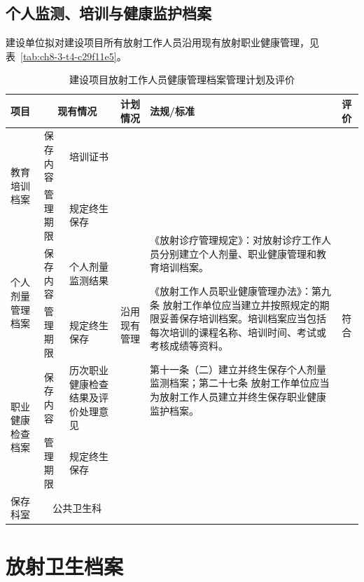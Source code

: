 \subsection{个人监测、培训与健康监护档案}

建设单位拟对建设项目所有放射工作人员沿用现有放射职业健康管理，见表~\ref{tab:ch8-3-t4-c29f11e5}。


\begin{table}[H]
\centering
\caption{建设项目放射工作人员健康管理档案管理计划及评价}
\label{tab:ch8-3-t5-9edc314a}
\renewcommand{\arraystretch}{1.5}
\begin{tabular}{|m{1.8cm}|m{1.8cm}|m{2.4cm}|m{1.8cm}|m{5cm}|m{1cm}|}
\hline
项目
& \multicolumn{2}{c|}{现有情况}
& 计划情况
& 法规/标准
& 评价 \\
\hline
\multirow{2}{=}{教育培训档案}
& 保存内容 & 培训证书
& \multirow{7}{=}{沿用现有管理}
& \multirow{7}{=}{《放射诊疗管理规定》：对放射诊疗工作人员分别建立个人剂量、职业健康管理和教育培训档案。

《放射工作人员职业健康管理办法》：第九条 放射工作单位应当建立并按照规定的期限妥善保存培训档案。培训档案应当包括每次培训的课程名称、培训时间、考试或考核成绩等资料。

第十一条（二）建立并终生保存个人剂量监测档案；第二十七条 放射工作单位应当为放射工作人员建立并终生保存职业健康监护档案。}
& \multirow{7}{=}{符合} \\
\cline{2-3}
& 管理期限 & 规定终生保存 & & & \\
\cline{1-3}

\multirow{2}{=}{个人剂量管理档案}
& 保存内容 & 个人剂量监测结果 & & & \\
\cline{2-3}
& 管理期限 & 规定终生保存 & & & \\
\cline{1-3}

\multirow{2}{=}{职业健康检查档案}
& 保存内容 & 历次职业健康检查结果及评价处理意见 & & & \\
\cline{2-3}
& 管理期限 & 规定终生保存 & & & \\
\cline{1-3}

保存科室
& \multicolumn{2}{c|}{公共卫生科}
& & & \\
\hline
\end{tabular}
\end{table}


\section{放射卫生档案}

